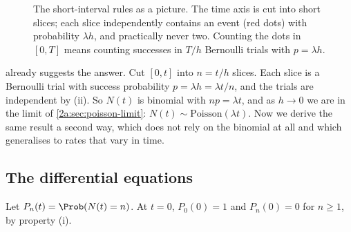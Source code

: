 \begin{figure}[htbp]
\centering
{}
\caption{The short-interval rules as a picture. The time axis is cut into short slices; each slice independently contains an event (red dots) with probability $\lambda h$, and practically never two. Counting the dots in $[0,T]$ means counting successes in $T/h$ Bernoulli trials with $p=\lambda h$.}
\label{2a:fig:slices}
\end{figure}

 already suggests the answer. Cut $[0,t]$ into $n=t/h$ slices. Each slice is a Bernoulli trial with success probability $p=\lambda h=\lambda t/n$, and the trials are independent by (ii). So $N(t)$ is binomial with $np=\lambda t$, and as $h\to0$ we are in the limit of \cref{2a:sec:poisson-limit}: $N(t)\sim\mathrm{Poisson}(\lambda t)$. Now we derive the same result a second way, which does not rely on the binomial at all and which generalises to rates that vary in time.

\subsection{The differential equations}

Let $P_n(t)=\Prob(N(t)=n)$. At $t=0$, $P_0(0)=1$ and $P_n(0)=0$ for $n\ge1$, by property (i).

